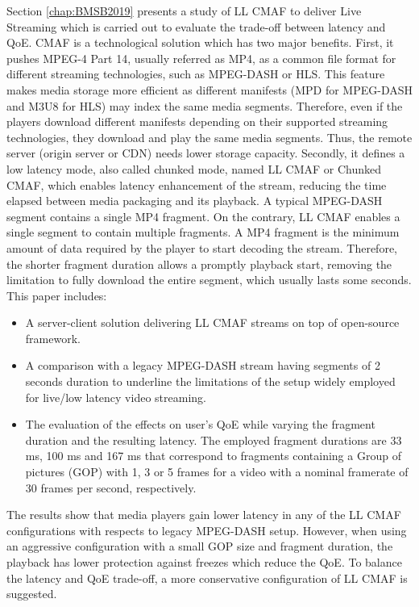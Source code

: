 Section \ref{chap:BMSB2019} presents a study of LL CMAF to deliver Live Streaming which is carried out to evaluate the trade-off between latency and QoE. CMAF is a technological solution which has two major benefits. First, it pushes MPEG-4 Part 14, usually referred as MP4, as a common file format for different streaming technologies, such as MPEG-DASH or HLS. This feature makes media storage more efficient as different manifests (MPD for MPEG-DASH and M3U8 for HLS) may index the same media segments. Therefore, even if the players download different manifests depending on their supported streaming technologies, they download and play the same media segments. Thus, the remote server (origin server or CDN) needs lower storage capacity. Secondly, it defines a low latency mode, also called chunked mode, named LL CMAF or Chunked CMAF, which enables latency enhancement of the stream, reducing the time elapsed between media packaging and its playback. A typical MPEG-DASH segment contains a single MP4 fragment. On the contrary, LL CMAF enables a single segment to contain multiple fragments. A MP4 fragment is the minimum amount of data required by the player to start decoding the stream. Therefore, the shorter fragment duration allows a promptly playback start, removing the limitation to fully download the entire segment, which usually lasts some seconds. This paper includes:
\begin{itemize}
	\item A server-client solution delivering LL CMAF streams on top of open-source framework. 
	\item A comparison with a legacy MPEG-DASH stream having segments of 2 seconds duration to underline the limitations of the setup widely employed for live/low latency video streaming.
	\item The evaluation of the effects on user's QoE while varying the fragment duration and the resulting latency. The employed fragment durations are 33 ms, 100 ms and 167 ms that correspond to fragments containing a Group of pictures (GOP) with 1, 3 or 5 frames for a video with a nominal framerate of 30 frames per second, respectively.
\end{itemize}
The results show that media players gain lower latency in any of the LL CMAF configurations with respects to legacy MPEG-DASH setup. However, when using an aggressive configuration with a small GOP size and fragment duration, the playback has lower protection against freezes which reduce the QoE. To balance the latency and QoE trade-off, a more conservative configuration of LL CMAF is suggested. 
